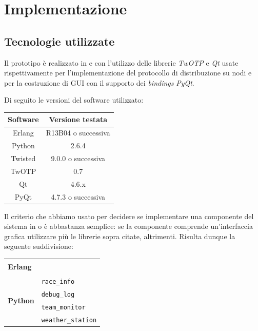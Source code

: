 \chapter{Implementazione}

\section{Tecnologie utilizzate}
Il prototipo è realizzato in \Erlang{} e \Python{} con l'utilizzo delle librerie \textsl{TwOTP} e \textsl{Qt} usate rispettivamente per l'implementazione del protocollo di distribuzione \Erlang{} su nodi \Python{} e per la costruzione di GUI con il supporto dei \textit{bindings} \textsl{PyQt}.

Di seguito le versioni del software utilizzato:
\begin{center}
\begin{tabular}{c|c}
\textbf{Software} & \textbf{Versione testata} \\
\hline
Erlang & R13B04 o successiva \\
\hline
Python & 2.6.4 \\
\hline
Twisted & 9.0.0 o successiva \\
TwOTP & 0.7 \\
\hline
Qt & 4.6.x \\
PyQt & 4.7.3 o successiva \\
\end{tabular}
\end{center}

Il criterio che abbiamo usato per decidere se implementare una componente del sistema in \Erlang{} o \Python{} è abbastanza semplice: se la componente comprende un'interfaccia grafica utilizzare \Python{} più le librerie sopra citate, \Erlang{} altrimenti. Risulta dunque la seguente suddivisione:
\begin{center}
\begin{tabular}{|p{}|p{}|}
\hline
\multirow{6}{*}{\textbf{Erlang}} & \sched{}\\
& \evdisp{}\\
& \weather{}\\
& \track{}\\
& \team{}\\
& \car{}\\
\hline
\multirow{4}{*}{\textbf{Python}} & \texttt{race\_info}\\
& \texttt{debug\_log}\\
& \texttt{team\_monitor}\\
& \texttt{weather\_station}\\
\hline
\end{tabular}
\end{center}

